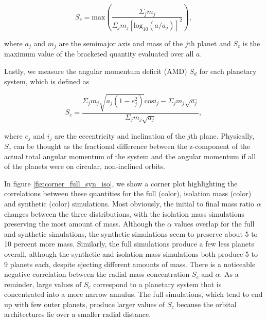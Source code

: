 \begin{equation}\label{eq:rmc}
	S_{c} = \mathrm{max} \left( \frac{\Sigma_{j} m_{j}}{\Sigma_{j} m_{j} \left[ \mathrm{log}_{10} \left( a / a_{j} \right) \right]^{2}} \right),
\end{equation}

\noindent where $a_{j}$ and $m_{j}$ are the semimajor axis and mass of the $j$th planet and $S_{c}$ is the maximum value of the bracketed quantity evaluated over all $a$.

Lastly, we measure the angular momentum deficit (AMD) $S_{d}$ for each planetary system, which is defined as

\begin{equation}\label{eq:amd}
	S_{c} = \frac{\Sigma_{j} m_{j} \sqrt{a_{j} \left( 1 - e_{j}^2 \right)} \mathrm{cos} i_{j} - \Sigma_{j} m_{j} \sqrt{a_{j}}}{\Sigma_{j} m_{j} \sqrt{a_{j}}},
\end{equation}

\noindent \cite{laskar97, chambers01} where $e_{j}$ and $i_{j}$ are the eccentricity and inclination of the $j$th plane. Physically, $S_{c}$ can be thought as the fractional difference between the z-component of the actual total angular momentum of the system and the angular momentum if all of the planets were on circular, non-inclined orbits.

In figure \ref{fig:corner_full_syn_iso}, we show a corner plot highlighting the correlations between these quantities for the full (color), isolation mass (color) and synthetic (color) simulations. Most obviously, the initial to final mass ratio $\alpha$ changes between the three distributions, with the isolation mass simulations preserving the most amount of mass. Although the $\alpha$ values overlap for the full and synthetic simulations, the synthetic simulations seem to preserve about 5 to 10 percent more mass. Similarly, the full simulations produce a few less planets overall, although the synthetic and isolation mass simulations both produce 5 to 9 planets each, despite ejecting different amounts of mass. There is a noticeable negative correlation between the radial mass concentration $S_{c}$ and $\alpha$. As a reminder, large values of $S_{c}$ correspond to a planetary system that is concentrated into a more narrow annulus. The full simulations, which tend to end up with few outer planets, produce larger values of $S_{c}$ because the orbital architectures lie over a smaller radial distance.


